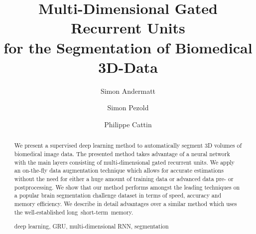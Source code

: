 \documentclass[runningheads,a4paper]{llncs}
\newcommand{\keywords}[1]{\par\addvspace\baselineskip
\noindent\keywordname\enspace\ignorespaces#1}
\begin{document}
\mainmatter  %

\title{Multi-Dimensional Gated Recurrent Units\\
for the Segmentation of Biomedical 3D-Data}


%
%
\author{Simon Andermatt \and Simon Pezold \and Philippe Cattin}
%


%
%

\maketitle


\begin{abstract}
We present a supervised deep learning method to automatically segment 3D volumes of biomedical image data. The presented method takes advantage of a neural network with the main layers consisting of multi-dimensional gated recurrent units. We apply an on-the-fly data augmentation technique which allows for accurate estimations without the need for either a huge amount of training data or advanced data pre- or postprocessing. We show that our method performs amongst the leading techniques on a popular brain segmentation challenge dataset in terms of speed, accuracy and memory efficiency. We describe in detail advantages over a similar method which uses the well-established long~short-term~memory.

\keywords{deep learning, GRU, multi-dimensional RNN, segmentation}
\end{abstract}
\end{document}
